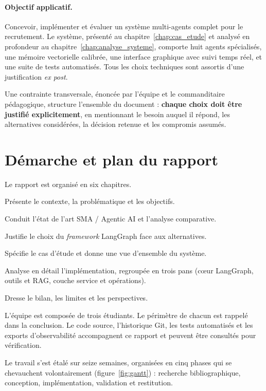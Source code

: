 \paragraph{Objectif applicatif.} Concevoir, implémenter et évaluer un système multi-agents complet pour le recrutement. Le système, présenté au chapitre~\ref{chap:cas_etude} et analysé en profondeur au chapitre~\ref{chap:analyse_systeme}, comporte huit agents spécialisés, une mémoire vectorielle calibrée, une interface graphique avec suivi temps réel, et une suite de tests automatisés. Tous les choix techniques sont assortis d'une justification \emph{ex post}.

Une contrainte transversale, énoncée par l'équipe et le commanditaire pédagogique, structure l'ensemble du document : \textbf{chaque choix doit être justifié explicitement}, en mentionnant le besoin auquel il répond, les alternatives considérées, la décision retenue et les compromis assumés.

\section{Démarche et plan du rapport}

Le rapport est organisé en six chapitres.

\begin{description}[leftmargin=1.4cm,style=nextline]
\item[Chapitre~\ref{chap:presentation}.] Présente le contexte, la problématique et les objectifs.
\item[Chapitre~\ref{chap:etat_art}.] Conduit l'état de l'art SMA / Agentic AI et l'analyse comparative.
\item[Chapitre~\ref{chap:choix_framework}.] Justifie le choix du \emph{framework} LangGraph face aux alternatives.
\item[Chapitre~\ref{chap:cas_etude}.] Spécifie le cas d'étude et donne une vue d'ensemble du système.
\item[Chapitre~\ref{chap:analyse_systeme}.] Analyse en détail l'implémentation, regroupée en trois pans (cœur LangGraph, outils et RAG, couche service et opérations).
\item[Chapitre~\ref{chap:conclusion}.] Dresse le bilan, les limites et les perspectives.
\end{description}

L'équipe est composée de trois étudiants. Le périmètre de chacun est rappelé dans la conclusion. Le code source, l'historique Git, les tests automatisés et les exports d'observabilité accompagnent ce rapport et peuvent être consultés pour vérification.

Le travail s'est étalé sur seize semaines, organisées en cinq phases qui se chevauchent volontairement (figure~\ref{fig:gantt}) : recherche bibliographique, conception, implémentation, validation et restitution.


